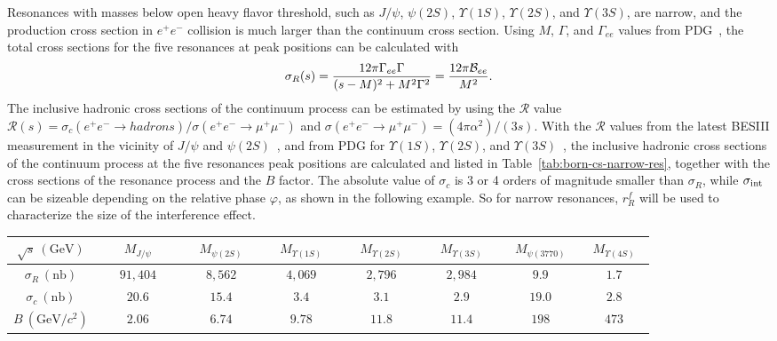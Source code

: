 \documentclass[%
preprint,
 amsmath,amssymb,
 aps,
]{revtex4-2}
\newcommand{\br}{{\cal B}}
\newcommand{\EE}{e^+e^-}
\newcommand{\MM}{\mu^+\mu^-}
\newcommand{\psip}{\psi(2S)}
\newcommand{\psipp}{\psi(3770)}
\newcommand{\jpsi}{J/\psi}
\newcommand{\upsi}{\Upsilon(1S)}
\newcommand{\upsip}{\Upsilon(2S)}
\newcommand{\gev}{\mathrm{GeV}}
\newcommand{\gevcc}{\mathrm{GeV}/c^2}
\newcommand{\nb}{\mathrm{nb}}
\begin{document}
Resonances with masses below open heavy flavor threshold, such as 
$\jpsi$, $\psip$, $\upsi$, $\upsip$, and $\Upsilon(3S)$, are narrow, and 
the production cross section in $\EE$ collision is much larger than the 
continuum cross section. Using $M$, $\Gamma$, and $\Gamma_{ee}$ values from 
PDG~\cite{pdg2020}, the total cross sections for the five resonances at peak 
positions can be calculated with 
\begin{equation}\label{eq:cs-res}
    \sigma_{R}(s)=\frac{12\pi\Gamma_{ee}\Gamma}{(s-M)^2+M^2\Gamma^2}=\frac{12\pi\br_{ee}}{M^2}.
\end{equation}
The inclusive hadronic cross sections of the continuum process can be estimated
by using the $\mathcal{R}$ value 
$\mathcal{R}(s)=\sigma_c(\EE\to hadrons)/\sigma(\EE\to\MM)$ and 
$\sigma(\EE\to\MM)=(4\pi\alpha^2)/(3s)$. With the $\mathcal{R}$ values from 
the latest BESIII measurement in the vicinity of $\jpsi$ and 
$\psip$~\cite{BESIII-R}, and from PDG for $\upsi$, $\upsip$, and 
$\Upsilon(3S)$~\cite{pdg2020}, the inclusive hadronic cross sections of the continuum process
at the five resonances peak positions are calculated and listed in 
Table~\ref{tab:born-cs-narrow-res}, together with the cross sections of
the resonance process and the $B$ factor. 
The absolute value of $\sigma_{c}$ is 3 or 4 orders of magnitude 
smaller than $\sigma_R$, while $\sigma_{\rm int}$ can be sizeable depending 
on the relative phase $\varphi$, as shown in the following example. 
So for narrow resonances, $r_{R}^{f}$ will be used to characterize 
the size of the interference effect. 

\begin{table*}[htbp]
\caption{The cross sections of the resonances ($\sigma_{R}$), the 
continuum process ($\sigma_{c}$), and the factor $B$
at the resonance peak positions.}
\label{tab:born-cs-narrow-res}
\begin{center}
\begin{tabular}{cccccc|cc}
\hline\hline
$\sqrt{s}~(\gev)$ & $M_{\jpsi}$  &  $M_{\psip}$  &  $M_{\upsi}$  &  $M_{\upsip}$ 
&  $M_{\Upsilon(3S)}$  &~$M_{\psipp}$~ & ~$M_{\Upsilon(4S)}$~\\\hline
$\sigma_{R}~(\nb)$ &~~~$91,404$~~~ &~~~$8,562$~~~&~~~$4,069$~~~&~~~$2,796$~~~
&~~~$2,984$~~~&~~~$9.9$~~~ &~~~$1.7$~~~\\ 
$\sigma_{c}~(\nb)$ &  $20.6$      &  $15.4$   &  $3.4$   &  $3.1$  & $2.9$ 
& $19.0$ & $2.8$ \\ 
$B~(\gevcc)$           &  $2.06$     & $6.74$   & $9.78$  & $11.8$  & $11.4$
& $198$ & $473$  \\
\hline\hline
\end{tabular}
\end{center}
\end{table*}
\end{document}
